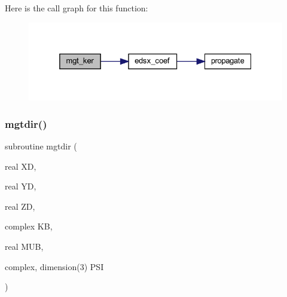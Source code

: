 Here is the call graph for this function\+:\nopagebreak
\begin{figure}[H]
\begin{center}
\leavevmode
\includegraphics[width=325pt]{Leroi__c_8f90_ad35190cbd2113592b83c9f1e721b8d07_cgraph}
\end{center}
\end{figure}
\mbox{\label{Leroi__c_8f90_a96acb0ecb10b6c9a318ee0aa7cc60bdc}} 
\subsubsection{\texorpdfstring{mgtdir()}{mgtdir()}}
{\footnotesize\ttfamily subroutine mgtdir (\begin{DoxyParamCaption}\item[{real}]{XD,  }\item[{real}]{YD,  }\item[{real}]{ZD,  }\item[{complex}]{KB,  }\item[{real}]{M\+UB,  }\item[{complex, dimension(3)}]{P\+SI }\end{DoxyParamCaption})}

\mbox{\label{Leroi__c_8f90_a8f13594331f001917eefb525bce81f61}} 
